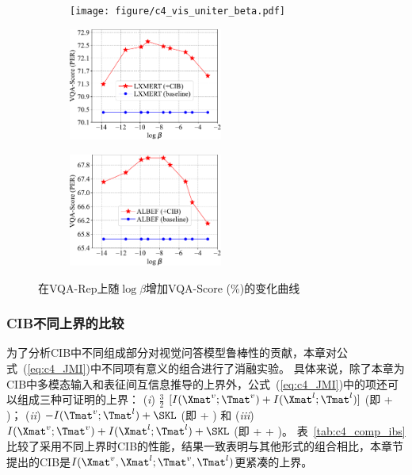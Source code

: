 



\begin{figure}[!t]
\begin{subfigure}[b]{0.32\linewidth}
\centering
\texttt{[image: figure/c4\_vis\_uniter\_beta.pdf]}
\label{fig:c4_ph_1}
\end{subfigure}
\begin{subfigure}[b]{0.32\linewidth}
\centering
\includegraphics[height=3.7cm]{figure/c4_vis_lxmert_beta.pdf}
\label{fig:c4_ph_2}
\end{subfigure}
\begin{subfigure}[b]{0.32\linewidth}
\centering
\includegraphics[height=3.7cm]{figure/c4_vis_albef_beta.pdf}
\label{fig:c4_ph_3}
\end{subfigure}
\caption{在VQA-Rep上随$\log\beta$增加VQA-Score (\%)的变化曲线
}
\label{fig:c4_hp_beta}
\end{figure}



\subsubsection{CIB不同上界的比较}
为了分析CIB中不同组成部分对视觉问答模型鲁棒性的贡献，本章对公式~(\ref{eq:c4_JMI})中不同项有意义的组合进行了消融实验。
具体来说，除了本章为CIB中多模态输入和表征间互信息推导的上界外，公式~(\ref{eq:c4_JMI})中的项还可以组成三种可证明的上界：
(\emph{i}) $\frac{3}{2}$ $[I(\Xmat^v; \Tmat^v) + I(\Xmat^l; \Tmat^l)]$ (即  + )；
(\emph{ii}) $-I(\Tmat^v; \Tmat^l) + \SKL$ (即  + ) 和
(\emph{iii}) $I(\Xmat^v; \Tmat^v) + I(\Xmat^l; \Tmat^l) + \SKL$ (即  +  + )。
表~\ref{tab:c4_comp_ibs}比较了采用不同上界时CIB的性能，结果一致表明与其他形式的组合相比，本章节提出的CIB是$I(\Xmat^v, \Xmat^l; \Tmat^v, \Tmat^l)$更紧凑的上界。


